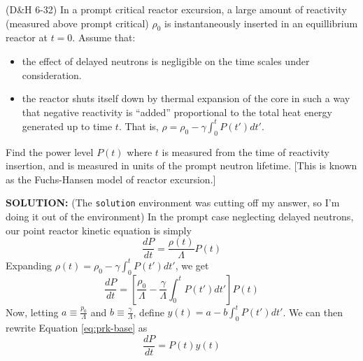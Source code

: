 \documentclass[11pt,addpoints,answers]{exam}
\begin{document}
\begin{questions}
\begin{solution}
                \end{solution}
       
        \question[10] (D\&H 6-32) In a prompt critical reactor excursion, a 
        large amount of reactivity (measured above prompt critical) $\rho_0$ is 
        instantaneously inserted in an equillibrium reactor at $t=0$. Assume 
        that:
        \begin{itemize}
                \item the effect of delayed neutrons is negligible on the time 
                        scales under consideration.
                \item the reactor shuts itself down by thermal expansion of the 
                        core in such a way that negative reactivity is 
                        ``added'' proportional to the total heat energy 
                        generated up to time $t$. That is, $\rho = \rho_0 - 
                        \gamma\int_0^t{P(t')dt'}$. 
        \end{itemize}

        Find the power level $P(t)$  where $t$ is measured from the time of 
        reactivity insertion, and is measured in units of the prompt neutron lifetime.
        [This is known as the Fuchs-Hansen model of reactor excursion.]

        {\bf SOLUTION:} (The \verb.solution. environment was cutting off my
        answer, so I'm doing it out of the environment)
                    In the prompt case neglecting delayed neutrons, our point
                    reactor kinetic equation is simply
                    \[
                        \frac{dP}{dt} = \frac{\rho(t)}{\Lambda} P(t)
                    \]
                    Expanding $\rho(t) = \rho_0 - \gamma \int_{0}^{t} P(t')dt'$,
                    we get
                    \begin{equation}
                        \label{eq:prk-base}
                        \frac{dP}{dt} = \left[\frac{\rho_0}{\Lambda} -
                        \frac{\gamma}{\Lambda}\int_{0}^{t}P(t') dt'\right] P(t)
                    \end{equation}
                    Now, letting $a \equiv \frac{p_0}{\Lambda}$ and $b \equiv
                    \frac{\gamma}{\Lambda}$, define $y(t) = a -
                    b\int_{0}^{t}P(t') dt'$. We can then rewrite Equation
                    \ref{eq:prk-base} as
                    \begin{equation}
                        \label{eq:prk-y}
                        \frac{dP}{dt} = P(t)y(t)
                    \end{equation}


\end{questions}
\end{document}
